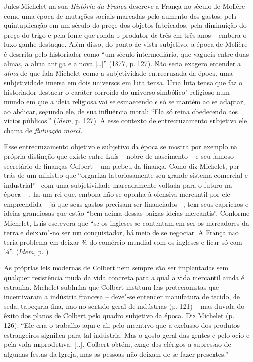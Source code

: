 Jules Michelet na sua \emph{História da França} descreve a França no
século de Molière como uma época de mutações sociais marcadas pelo
aumento dos gastos, pela quintuplicação em um século do preço dos
objetos fabricados, pela diminuição do preço do trigo e pela fome que
ronda o produtor de três em três anos -- embora o luxo ganhe destaque.
Além disso, do ponto de vista subjetivo, a época
de Molière é descrita pelo historiador como ``um século intermediário,
que vagueia entre duas almas, a alma antiga e a nova [\ldots{}]'' (1877,
p. 127). Não seria exagero entender a \emph{alma} de que fala Michelet
como a subjetividade entrecruzada da época, uma subjetividade imersa em
dois universos em luta tensa. Uma luta tensa que faz o historiador
destacar o caráter corroído do universo simbólico"-religioso num mundo em
que a ideia religiosa vai se esmaecendo e só se mantém ao se adaptar, ao
abdicar, segundo ele, de sua influência moral: ``Ela só reina obedecendo
aos vícios públicos.'' (\emph{Idem}, p. 127). A esse contexto de
entrecruzamento subjetivo ele chama de \emph{flutuação} \emph{moral.}

Esse entrecruzamento objetivo e subjetivo da época se mostra por exemplo
na própria distinção que existe entre Luís  -- nobre de nascimento --
e seu famoso secretário de finanças Colbert -- um plebeu da finança.
Como diz Michelet, por trás de um ministro que ``organiza laboriosamente
seu grande sistema comercial e industrial''-- com uma subjetividade
marcadamente voltada para o futuro na época -- , há um rei que, embora
não se oponha à ofensiva mercantil por ele empreendida -- já que seus
gastos precisam ser financiados --, tem seus caprichos e ideias
grandiosas que estão ``bem acima dessas baixas ideias mercantis''.
Conforme Michelet, Luís  escrevera que ``se os ingleses se contentam
em ser os mercadores da terra e deixam"-no ser um conquistador, há meio
de se negociar. A França não teria problema em deixar ¾ do comércio
mundial com os ingleses e ficar só com ¼''. (\emph{Idem,} p. )

As próprias leis modernas de Colbert nem sempre vão ser implantadas sem
qualquer resistência muda da vida concreta para a qual a vida mercantil
ainda é estranha. Michelet sublinha que Colbert instituiu leis
protecionistas que incentivaram a indústria francesa -- deve"-se entender
manufatura de tecido, de seda, tapeçaria fina, não no sentido geral de
indústrias (p. 121) -- mas duvida do êxito dos planos de Colbert pelo
quadro subjetivo da época. Diz Michelet (p. 126): ``Ele cria o trabalho
aqui e ali pelo incentivo que a exclusão dos produtos estrangeiros
significa para tal indústria. Mas o gosto geral das gentes é pelo ócio e
pela vida improdutiva. [\ldots{}]. Colbert obtém, exige dos clérigos a
supressão de algumas festas da Igreja, mas as pessoas não deixam de se
fazer presentes.''

